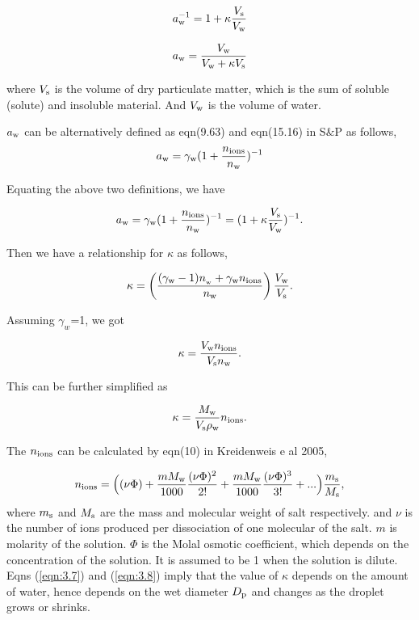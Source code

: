 \documentclass[12pt]{article}
\begin{document}
\begin{equation}\label{eqn:3.1}
a_{\rm w}^{-1}=1+\kappa \frac{V_{\rm s}}{V_{\rm w}}
\end{equation}

\begin{equation}\label{eqn:3.2}
a_{\rm w}=\frac{V_{\rm w}}{V_{\rm w} + \kappa V_{\rm s}}
\end{equation}

where $V_{\rm s}$ is the volume of dry particulate matter, which is the sum of soluble (solute) and insoluble material. And $V_{\rm w}$ is the volume of water.

$a_{\rm w}$ can be alternatively defined as eqn(9.63) and eqn(15.16) in S$\&$P as follows, 
\begin{equation}\label{eqn:3.3}
a_{\rm w}=\gamma_{\rm w}(1+\frac{n_{\rm ions}}{n_{\rm w}})^{-1}
\end{equation}

Equating the above two definitions, we have

\begin{equation}\label{eqn:3.4}
a_{\rm w}=\gamma_{\rm w}(1+\frac{n_{\rm ions}}{n_{\rm w}})^{-1}=(1+\kappa \frac{V_{\rm s}}{V_{\rm w}})^{-1}.
\end{equation}

Then we have a relationship for $\kappa$ as follows,

\begin{equation}\label{eqn:3.5}
\kappa=\left(\frac{(\gamma_{\rm w}-1)n_{\rm_w}+\gamma_{\rm w}n_{\rm ions}}{n_{\rm w}}\right)\frac{V_{\rm w}}{V_{\rm s}}.
\end{equation} 

Assuming $\gamma_{w}$=1, we got 

\begin{equation}\label{eqn:3.6}
\kappa= \frac{V_{\rm w} n_{\rm ions}}{V_{\rm s} n_{\rm w}}.
\end{equation}

This can be further simplified as 

\begin{equation}\label{eqn:3.7}
\kappa= \frac{M_{\rm w}}{V_{\rm s} \rho_{\rm w}}n_{\rm ions}.
\end{equation}

The $n_{\rm ions}$ can be  calculated by eqn(10) in Kreidenweis e al 2005, 

\begin{equation}\label{eqn:3.8}
n_{\rm ions}=\Big((\nu \Phi) + \frac{m M_{\rm w}}{1000} \frac{(\nu \Phi)^{2}}{2!} + \frac{m M_{\rm w}}{1000} \frac{(\nu \Phi)^{3}}{3!}+... \Big) \frac{m_{\rm s}}{M_{\rm s}},
\end{equation}
where $m_{\rm s}$ and $M_{\rm s}$ are the mass and molecular weight of salt respectively. and $\nu$ is the number of ions produced per dissociation of one molecular of the salt. $m$ is molarity of the solution. $\Phi$ is the Molal osmotic coefficient, which depends on the concentration of the solution. It is assumed to be 1 when the solution is dilute. Eqns (\ref{eqn:3.7}) and (\ref{eqn:3.8}) imply that the value of $\kappa$ depends on the amount of water, hence depends on the wet diameter $D_{\rm p}$ and changes as the droplet grows or shrinks.
\end{document}
